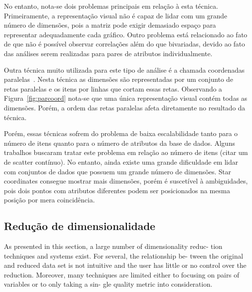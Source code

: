 No entanto, nota-se dois problemas principais em relação à esta técnica. Primeiramente, a representação visual não é capaz de lidar com um grande número de dimensões, pois a matriz pode exigir demasiado espaço para representar adequadamente cada gráfico. Outro problema está relacionado ao fato de que não é possível observar correlações além do que bivariadas, devido ao fato das análises serem realizadas para pares de atributos individualmente. 

Outra técnica muito utilizada para este tipo de análise é a chamada coordenadas paralelas~\cite{PC1990}. Nesta técnica as dimensões são representadas por um conjunto de retas paralelas e os itens por linhas que cortam essas retas. Observando a Figura~\ref{fig:parcoord} nota-se que uma única representação visual contém todas as dimensões. Porém, a ordem das retas paralelas afeta diretamente no resultado da técnica.


Porém, essas técnicas sofrem do problema de baixa escalabilidade tanto para o número de itens quanto para o número de atributos da base de dados. Alguns trabalhos buscaram tratar este problema em relação ao número de itens \cite{Heinrich2009,Kandogan00} (citar um de scatter contínuo). No entanto, ainda existe uma grande dificuldade em lidar com conjuntos de dados que possuem um grande número de dimensões. Star coordinates consegue mostrar mais dimensões, porém é suscetível à ambiguidades, pois dois pontos com atributos diferentes podem ser posicionados na mesma posição por mera coincidência.




\subsection{Redução de dimensionalidade} 

As presented in this section, a large number of dimensionality reduc- tion techniques and systems exist. For several, the relationship be- tween the original and reduced data set is not intuitive and the user has little or no control over the reduction. Moreover, many techniques are limited either to focusing on pairs of variables or to only taking a sin- gle quality metric into consideration. 

